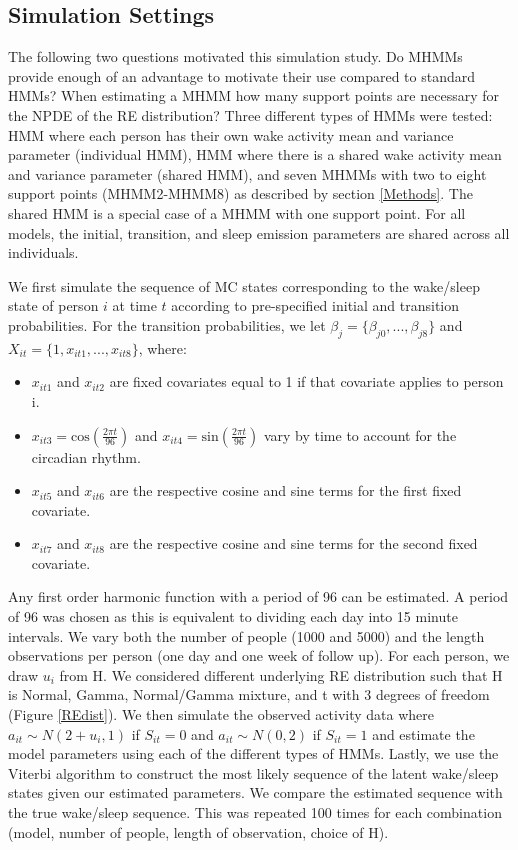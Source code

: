 \documentclass[num-refs]{wiley-article}
\begin{document}
\subsection{Simulation Settings} \label{SimSettings}

The following two questions motivated this simulation study. Do MHMMs provide enough of an advantage to motivate their use compared to standard HMMs? When estimating a MHMM how many support points are necessary for the NPDE of the RE distribution? Three different types of HMMs were tested: HMM where each person has their own wake activity mean and variance parameter (individual HMM), HMM where there is a shared wake activity mean and variance parameter (shared HMM), and seven MHMMs with two to eight support points (MHMM2-MHMM8) as described by section \ref{Methods}. The shared HMM is a special case of a MHMM with one support point. For all models, the initial, transition, and sleep emission parameters are shared across all individuals.

We first simulate the sequence of MC states corresponding to the wake/sleep state of person $i$ at time $t$ according to pre-specified initial and transition probabilities. For the transition probabilities, we let $\beta_j = \{\beta_{j0}, ..., \beta_{j8}\}$ and $X_{it} = \{1, x_{it1}, ..., x_{it8}\}$, where:
\begin{itemize}
    \item $x_{it1}$ and $x_{it2}$ are fixed covariates equal to 1 if that covariate applies to person i.
    \item $x_{it3} = \text{cos}(\frac{2\pi t}{96})$ and $x_{it4} = \text{sin}(\frac{2\pi t}{96})$ vary by time to account for the circadian rhythm.
    \item $x_{it5}$ and $x_{it6}$ are the respective cosine and sine terms for the first fixed covariate.
    \item $x_{it7}$ and $x_{it8}$ are the respective cosine and sine terms for the second fixed covariate.
\end{itemize}

Any first order harmonic function with a period of 96 can be estimated. A period of 96 was chosen as this is equivalent to dividing each day into 15 minute intervals. We vary both the number of people (1000 and 5000) and the length observations per person (one day and one week of follow up). For each person, we draw $u_i$ from H. We considered different underlying RE distribution such that H is Normal, Gamma, Normal/Gamma mixture, and t with 3 degrees of freedom (Figure \ref{REdist}). We then simulate the observed activity data where $a_{it} \sim N(2+u_i,1)$ if $S_{it}=0$ and $a_{it} \sim N(0,2)$ if $S_{it}=1$ and estimate the model parameters using each of the different types of HMMs. Lastly, we use the Viterbi algorithm to construct the most likely sequence of the latent wake/sleep states given our estimated parameters. We compare the estimated sequence with the true wake/sleep sequence. This was repeated 100 times for each combination (model, number of people, length of observation, choice of H).
\end{document}

